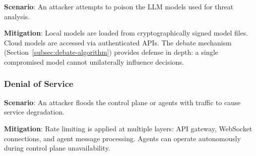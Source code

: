 \textbf{Scenario}: An attacker attempts to poison the LLM models used for threat analysis.

\textbf{Mitigation}: Local models are loaded from cryptographically signed model files. Cloud models are accessed via authenticated APIs. The debate mechanism (Section~\ref{subsec:debate-algorithm}) provides defense in depth: a single compromised model cannot unilaterally influence decisions.

\subsubsection{Denial of Service}

\textbf{Scenario}: An attacker floods the control plane or agents with traffic to cause service degradation.

\textbf{Mitigation}: Rate limiting is applied at multiple layers: API gateway, WebSocket connections, and agent message processing. Agents can operate autonomously during control plane unavailability.
